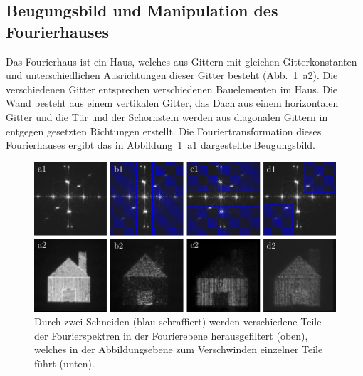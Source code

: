 


\subsection{Beugungsbild und Manipulation des Fourierhauses}

Das Fourierhaus ist ein Haus, welches aus Gittern mit gleichen Gitterkonstanten und unterschiedlichen Ausrichtungen dieser Gitter besteht (Abb.~\ref{fig:fourierhaus_mit_filtern}~a2). Die verschiedenen Gitter entsprechen verschiedenen Bauelementen im Haus. Die Wand besteht aus einem vertikalen Gitter, das Dach aus einem horizontalen Gitter und die Tür und der Schornstein werden aus diagonalen Gittern in entgegen gesetzten Richtungen erstellt. Die Fouriertransformation dieses Fourierhauses ergibt das in Abbildung~\ref{fig:fourierhaus_mit_filtern}~a1 dargestellte Beugungsbild.

\begin{figure}[h]
	\centering
	\includegraphics[scale=1]{images/Regina/abb21.pdf}
	
	\caption[Fourierhaus mit verschiedenen Filtern]{
		Durch zwei Schneiden (blau schraffiert) werden verschiedene Teile der Fourierspektren in der Fourierebene herausgefiltert (oben), welches in der Abbildungsebene zum Verschwinden einzelner Teile führt (unten).
	}
	\label{fig:fourierhaus_mit_filtern}
\end{figure}

